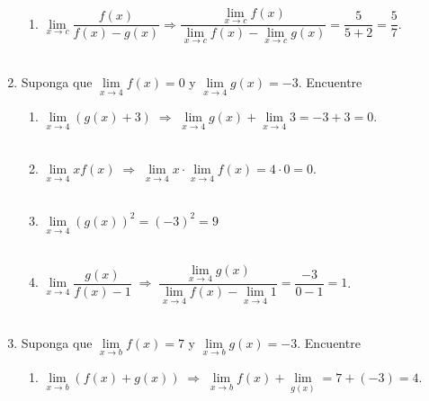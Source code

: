 \begin{enumerate}
\begin{enumerate}[\bfseries a)]
    \item $\lim\limits_{x\to c} \dfrac{f(x)}{f(x)-g(x)} \Longrightarrow \dfrac{\lim\limits_{x\to c} f(x)}{\lim\limits_{x\to c} f(x) - \lim\limits_{x\to c} g(x)} = \dfrac{5}{5+2} = \dfrac{5}{7}$.\\\\

\end{enumerate}

\item  Suponga que $\lim\limits_{x\to 4}f(x)=0$ y $\lim\limits_{x\to 4}g(x)=-3$. Encuentre
\begin{enumerate}[\bfseries a)]

    \item $\lim\limits_{x\to 4}(g(x)+3) \; \Longrightarrow \; \lim\limits_{x\to 4}g(x)+\lim\limits_{x\to 4}3 = -3 + 3 = 0$.\\\\

    \item $\lim\limits_{x\to 4}xf(x) \; \Longrightarrow \; \lim\limits_{x\to 4}x \cdot \lim\limits_{x\to 4}f(x) = 4 \cdot 0 = 0$.\\\\

    \item $\lim\limits_{x\to 4}(g(x))^2 = (-3)^2 = 9$\\\\

    \item $\lim\limits_{x\to 4}\dfrac{g(x)}{f(x)-1} \; \Longrightarrow \; \dfrac{\lim\limits_{x\to 4}g(x)}{\lim\limits_{x\to 4}f(x)-\lim\limits_{x\to 4}1} = \dfrac{-3}{0-1} = 1$.\\\\

\end{enumerate}
    
\item  Suponga que $\lim\limits_{x\to b}f(x) = 7$ y $\lim\limits_{x\to b}g(x)=-3$. Encuentre
\begin{enumerate}[\bfseries a)]

    \item $\lim\limits_{x\to b}(f(x) + g(x)) \; \Longrightarrow \; \lim\limits_{x\to b}f(x)+\lim\limits_{g(x)} = 7+(-3) = 4$.\\\\


\end{enumerate}
\end{enumerate}
